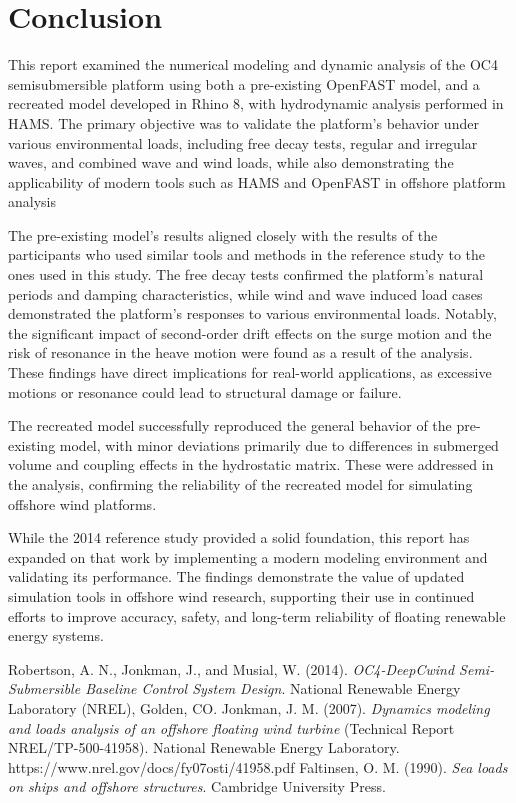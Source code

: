\documentclass[a4paper, 11pt]{article}
\begin{document}
\section{Conclusion}

\hspace*{0.5cm}This report examined the numerical modeling and dynamic analysis of the OC4 semisubmersible platform using both a pre-existing OpenFAST model, and a recreated model developed in Rhino 8, with hydrodynamic analysis performed in HAMS. The primary objective was to validate the platform's behavior under various environmental loads, including free decay tests, regular and irregular waves, and combined wave and wind loads, while also demonstrating the applicability of modern tools such as HAMS and OpenFAST in offshore platform analysis

The pre-existing model's results aligned closely with the results of the participants who used similar tools and methods in the reference study \cite{Robertson2014} to the ones used in this study. The free decay tests confirmed the platform's natural periods and damping characteristics, while wind and wave induced load cases demonstrated the platform's responses to various environmental loads. Notably, the significant impact of second-order drift effects on the surge motion and the risk of resonance in the heave motion were found as a result of the analysis. These findings have direct implications for real-world applications, as excessive motions or resonance could lead to structural damage or failure.

The recreated model successfully reproduced the general behavior of the pre-existing model, with minor deviations primarily due to differences in submerged volume and coupling effects in the hydrostatic matrix. These were addressed in the analysis, confirming the reliability of the recreated model for simulating offshore wind platforms.

While the 2014 reference study provided a solid foundation, this report has expanded on that work by implementing a modern modeling environment and validating its performance. The findings demonstrate the value of updated simulation tools in offshore wind research, supporting their use in continued efforts to improve accuracy, safety, and long-term reliability of floating renewable energy systems.


\newpage
\begin{thebibliography}{99}

 Robertson, A. N., Jonkman, J., and Musial, W. (2014). \textit{OC4-DeepCwind Semi-Submersible Baseline Control System Design}. National Renewable Energy Laboratory (NREL), Golden, CO.
 Jonkman, J. M. (2007). \textit{Dynamics modeling and loads analysis of an offshore floating wind turbine} (Technical Report NREL/TP-500-41958). National Renewable Energy Laboratory. https://www.nrel.gov/docs/fy07osti/41958.pdf
 Faltinsen, O. M. (1990). \textit{Sea loads on ships and offshore structures}. Cambridge University Press.


\end{thebibliography}
\end{document}
